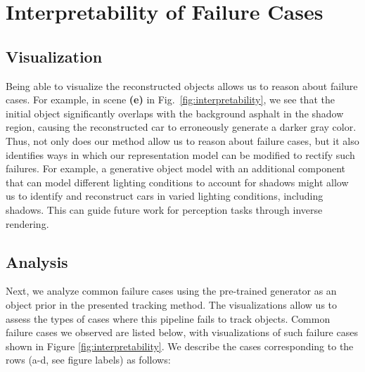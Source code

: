 \section{Interpretability of Failure Cases} 
%
\subsection{Visualization}
Being able to visualize the reconstructed objects allows us to reason about failure cases. For example, in scene \textbf{(e)} in Fig.~\ref{fig:interpretability}, we see that the initial object significantly overlaps with the background asphalt in the shadow region, causing the reconstructed car to erroneously generate a darker gray color. Thus, not only does our method allow us to reason about failure cases, but it also identifies ways in which our representation model can be modified to rectify such failures. For example, a generative object model with an additional component that can model different lighting conditions to account for shadows might allow us to identify and reconstruct cars in varied lighting conditions, including shadows. This can guide future work for perception tasks through inverse rendering. \hspace*{\fill} \\


\subsection{Analysis}
Next, we analyze common failure cases using the pre-trained generator as an object prior in the presented tracking method. The visualizations allow us to assess the types of cases where this pipeline fails to track objects. Common failure cases we observed are listed below, with visualizations of such failure cases shown in Figure \ref{fig:interpretability}. We describe the cases corresponding to the rows (a-d, see figure labels) as follows:

